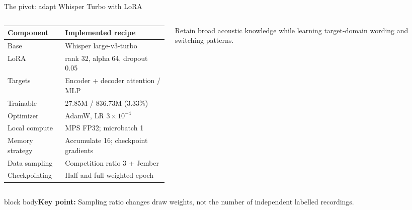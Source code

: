 \documentclass[aspectratio=169,11pt]{beamer}
\newcommand{\takeaway}[1]{\vfill\begin{beamercolorbox}[sep=2mm,wd=\linewidth]{block body}\small\textbf{Key point:} #1\end{beamercolorbox}}
\begin{document}
\begin{frame}{The pivot: adapt Whisper Turbo with LoRA}
\begin{columns}[T]
\begin{column}{0.55\textwidth}
\small
\begin{tabular}{@{}ll@{}}\toprule
\textbf{Component}&\textbf{Implemented recipe}\\\midrule
Base&Whisper large-v3-turbo\\
LoRA&rank 32, alpha 64, dropout 0.05\\
Targets&Encoder + decoder attention / MLP\\
Trainable&27.85M / 836.73M (3.33\%)\\
Optimizer&AdamW, LR $3\!\times\!10^{-4}$\\
Local compute&MPS FP32; microbatch 1\\
Memory strategy&Accumulate 16; checkpoint gradients\\
Data sampling&Competition ratio 3 + Jember\\
Checkpointing&Half and full weighted epoch\\\bottomrule
\end{tabular}
\end{column}
\begin{column}{0.41\textwidth}
\centering
{}
\vspace{3mm}\par\small Retain broad acoustic knowledge while learning target-domain wording and switching patterns.
\end{column}
\end{columns}
\takeaway{Sampling ratio changes draw weights, not the number of independent labelled recordings.}
\end{frame}
\end{document}
